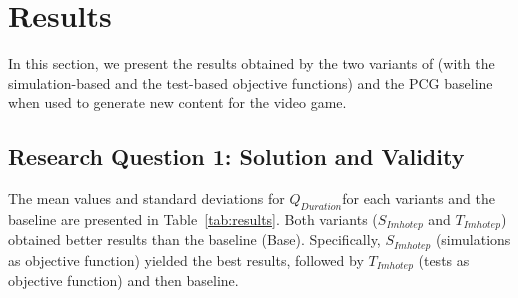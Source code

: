 \section{Results}
\label{sec:Results}

In this section, we present the results obtained by the two variants of \ApproachName{} (with the simulation-based and the test-based objective functions) and the PCG baseline when used to generate new content for the \CaseStudy{} video game.

\subsection{Research Question 1: Solution and Validity}

The mean values and standard deviations for $Q_{Duration}$for each \ApproachName{} variants and the baseline are presented in Table~\ref{tab:results}. Both variants ($S_{Imhotep}$ and $T_{Imhotep}$) obtained better results than the baseline (Base). Specifically, $S_{Imhotep}$ (simulations as objective function) yielded the best results, followed by $T_{Imhotep}$ (tests as objective function) and then baseline.


